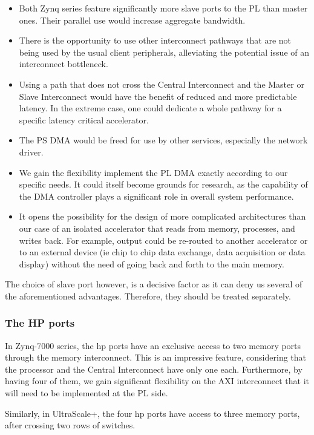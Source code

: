 \begin{itemize}
\item	Both Zynq series feature significantly more
	slave ports to the PL than master ones.
	Their parallel use would increase aggregate bandwidth.
\item	There is the opportunity to use other interconnect pathways that are not
	being used by the usual client peripherals, alleviating the potential
	issue of an interconnect bottleneck.
\item	Using a path that does not cross the Central Interconnect and the
	Master or Slave Interconnect would have the benefit of
	reduced and more predictable latency.
	In the extreme case, one could dedicate a whole pathway
	for a specific latency critical accelerator.
\item	The PS DMA would be freed for use by other services,
	especially the network driver.
\item	We gain the flexibility implement the PL DMA
	exactly according to our specific needs.
	It could itself become grounds for research,
	as the capability of the DMA controller
	plays a significant role in overall system performance.
\item	It opens the possibility for the design of more complicated
	architectures than our case of an isolated accelerator
	that reads from memory, processes, and writes back.
	For example, output could be re-routed to
	another accelerator or to an external device
	(ie chip to chip data exchange, data acquisition or data display)
	without the need of going back and forth to the main memory.
\end{itemize}

The choice of slave port however, is a decisive factor
as it can deny us several of the aforementioned advantages.
Therefore, they should be treated separately.

\subsubsection{The HP ports}

In Zynq-7000 series, the \gls{hp} ports have an
exclusive access to two memory ports
through the memory interconnect.
This is an impressive feature, considering that the processor and
the Central Interconnect have only one each.
Furthermore, by having four of them,
we gain significant flexibility on the AXI interconnect
that it will need to be implemented at the PL side.

Similarly, in UltraScale+, the four \gls{hp} ports have
access to three memory ports, after crossing two rows of switches.

